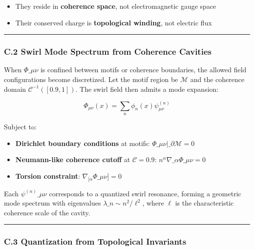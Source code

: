 \documentclass[
  11pt,
]{article}
\providecommand{\tightlist}{%
  \setlength{\itemsep}{0pt}\setlength{\parskip}{0pt}}
\begin{document}
\begin{itemize}
\tightlist
\item
  They reside in \textbf{coherence space}, not electromagnetic gauge
  space
\item
  Their conserved charge is \textbf{topological winding}, not electric
  flux
\end{itemize}

\begin{center}\rule{0.5\linewidth}{0.5pt}\end{center}

\subsubsection{\texorpdfstring{\textbf{C.2 Swirl Mode Spectrum from
Coherence
Cavities}}{C.2 Swirl Mode Spectrum from Coherence Cavities}}\label{c.2-swirl-mode-spectrum-from-coherence-cavities}

When \(\Phi\_{\mu\nu}\) is confined between motifs or coherence
boundaries, the allowed field configurations become discretized. Let the
motif region be \(\mathcal{M}\) and the coherence domain
\(\mathcal{C}^{-1}([0.9, 1])\). The swirl field then admits a mode
expansion:

\[
\Phi_{\mu\nu}(x) = \sum_{n} \phi_n(x) \psi^{(n)}_{\mu\nu}
\]

Subject to:

\begin{itemize}
\tightlist
\item
  \textbf{Dirichlet boundary conditions} at motifs:
  \(\Phi\_{\mu\nu}|\_{\partial\mathcal{M}} = 0\)
\item
  \textbf{Neumann-like coherence cutoff} at \(\mathcal{C} = 0.9\):
  \(n^\alpha \nabla\_\alpha \Phi\_{\mu\nu} = 0\)
\item
  \textbf{Torsion constraint}: \(\nabla_{[\alpha} \Phi\_{\mu\nu]} = 0\)
\end{itemize}

Each \(\psi^{(n)}\_{\mu\nu}\) corresponds to a quantized swirl
resonance, forming a geometric mode spectrum with eigenvalues
\(\lambda\_n \sim n^2/\ell^2\), where \(\ell\) is the characteristic
coherence scale of the cavity.

\begin{center}\rule{0.5\linewidth}{0.5pt}\end{center}

\subsubsection{\texorpdfstring{\textbf{C.3 Quantization from Topological
Invariants}}{C.3 Quantization from Topological Invariants}}\label{c.3-quantization-from-topological-invariants}
\end{document}

